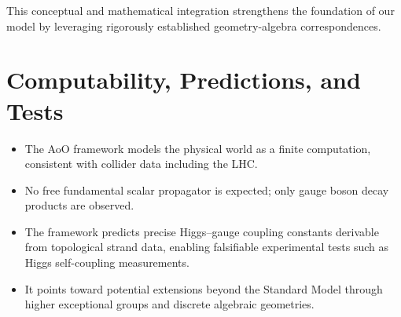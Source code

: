\documentclass[12pt]{article}
\theoremstyle{remark}
\begin{document}
This conceptual and mathematical integration strengthens the foundation of our model by leveraging rigorously established geometry-algebra correspondences.

\section{Computability, Predictions, and Tests}

\begin{itemize}
    \item The AoO framework models the physical world as a finite computation, consistent with collider data including the LHC.
    \item No free fundamental scalar propagator is expected; only gauge boson decay products are observed.
    \item The framework predicts precise Higgs--gauge coupling constants derivable from topological strand data, enabling falsifiable experimental tests such as Higgs self-coupling measurements.
    \item It points toward potential extensions beyond the Standard Model through higher exceptional groups and discrete algebraic geometries.
\end{itemize}
\end{document}
